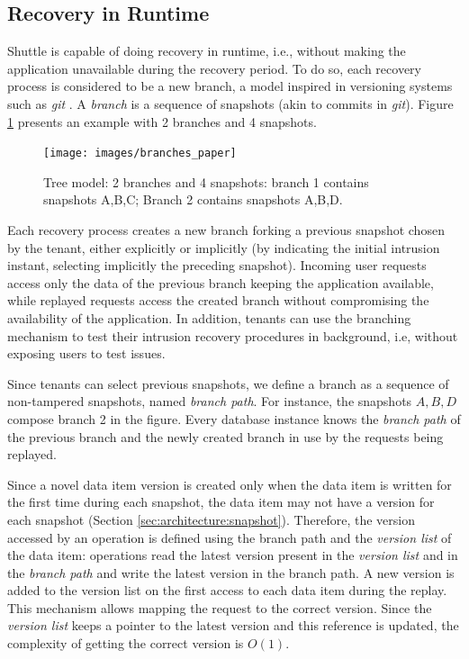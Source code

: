 \subsection{Recovery in Runtime}
\label{sec:recovery:runtime_recovery}
Shuttle is capable of doing recovery in runtime, i.e., without making the application unavailable during the recovery period. To do so, each recovery process is considered to be a new branch, a model inspired in versioning systems such as \emph{git} \cite{git}. A \emph{branch} is a sequence of snapshots (akin to commits in \emph{git}). Figure \ref{fig:branches} presents an example with 2 branches and 4 snapshots.

\begin{figure}
  \centering
  \texttt{[image: images/branches\_paper]}
  \caption{\footnotesize{Tree model:} 2 branches and 4 snapshots: branch 1 contains snapshots A,B,C; Branch 2 contains snapshots A,B,D.} %
  \label{fig:branches}
\end{figure}

Each recovery process creates a new branch forking a previous snapshot chosen by the tenant, either explicitly or implicitly (by indicating the initial intrusion instant, selecting implicitly the preceding snapshot). Incoming user requests access only the data of the previous branch keeping the application available, while replayed requests access the created branch without compromising the availability of the application. In addition, tenants can use the branching mechanism to test their intrusion recovery procedures in background, i.e, without exposing users to test issues.

Since tenants can select previous snapshots, we define a branch as a sequence of non-tampered snapshots, named \emph{branch path}. For instance, the snapshots $A,B,D$ compose  branch 2 in the figure. Every database instance knows the \emph{branch path} of the previous branch and the newly created branch in use by the requests being replayed.

Since a novel data item version is created only when the data item is written for the first time during each snapshot, the data item may not have a version for each snapshot (Section \ref{sec:architecture:snapshot}). Therefore, the version accessed by an operation is defined using the branch path and the \emph{version list} of the data item: operations read the latest version present in the \emph{version list} and in the \emph{branch path} and write the latest version in the branch path. A new version is added to the version list on the first access to each data item during the replay. This mechanism allows mapping the request to the correct version. Since the \emph{version list} keeps a pointer to the latest version and this reference is updated, the complexity of getting the correct version is $O(1)$. 

